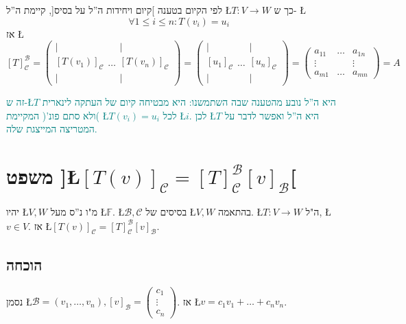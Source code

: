 \documentclass[english,hebrew]{article}
\begin{document}
לפי הקיום בטענה {]}קיום ויחידות ה\textquotedblright ל על בסיס{[},
קיימת ה\textquotedblright ל \L{$T:V\to W$} כך ש- \L{%
\[
\forall1\leq i\leq n:T(v_{i})=u_{i}
\]
}%
 אז \L{%
\[
[T]_{\mathcal{C}}^{\mathcal{B}}=\left(\begin{array}{c}
|\\{}
[T(v_{1})]_{\mathcal{C}}\\
|
\end{array}\dots\begin{array}{c}
|\\{}
[T(v_{n})]_{\mathcal{C}}\\
|
\end{array}\right)=\left(\begin{array}{c}
|\\{}
[u_{1}]_{\mathcal{C}}\\
|
\end{array}\dots\begin{array}{c}
|\\{}
[u_{n}]_{\mathcal{C}}\\
|
\end{array}\right)=\begin{pmatrix}a_{11} & \dots & a_{1n}\\
\vdots &  & \vdots\\
a_{m1} & \dots & a_{mn}
\end{pmatrix}=A
\]
}%

\textcolor{teal}{זה ש-\L{$T$} היא ה\textquotedblright ל נובע מהטענה
שבה השתמשנו: היא מבטיחה קיום של העתקה לינארית )ולא סתם פונ'( המקיימת
\L{$T(v_{i})=u_{i}$} לכל \L{$i$}. לכן \L{$T$} היא ה\textquotedblright ל
ואפשר לדבר על המטריצה המייצגת שלה. }

\section{משפט {]}\L{$[T(v)]_{\mathcal{C}}=[T]_{\mathcal{C}}^{\mathcal{B}}[v]_{\mathcal{B}}$}{[}}

יהיו \L{$V,W$} מ"ו נ\textquotedblright ס מעל \L{$\mathbb{F}$}.
\L{$\mathcal{B},\mathcal{C}$} בסיסים של \L{$V,W$} בהתאמה. \L{$T:V\to W$}
ה"ל, \L{$v\in V$}. אז \L{$[T(v)]_{\mathcal{C}}=[T]_{\mathcal{C}}^{\mathcal{B}}[v]_{\mathcal{B}}$}.

\subsection{הוכחה}

נסמן \L{$\mathcal{B}=(v_{1},\dots,v_{n}),[v]_{\mathcal{B}}=\begin{pmatrix}c_{1}\\
\vdots\\
c_{n}
\end{pmatrix}$}. אז \L{$v=c_{1}v_{1}+\dots+c_{n}v_{n}$}. 
\end{document}
